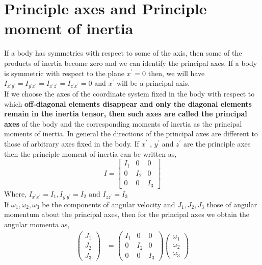 \section{Principle axes and Principle moment of inertia}
If  a body  has  symmetries  with  respect  to  some  of  the  axis,  then  some  of  the  products  of  inertia  become  zero  and  we  can  identify  the  principal  axes.   If  a  body  is  symmetric  with  respect  to  the plane $x^{\prime}=0$ then, we will have $I_{x^{\prime} y^{\prime}}=I_{y^{\prime} x^{\prime}}=I_{x^{\prime} z^{\prime}}=I_{z^{\prime} x^{\prime}}=0$ and $x^{\prime}$ will be a principal axis. 
\\If we choose the axes of the coordinate system fixed in the body with respect to which \textbf{off-diagonal elements disappear and only the diagonal elements remain in the inertia tensor, then such axes are called the principal axes} of the body and the corresponding moments of inertia as the principal moments of inertia. In general the directions of the principal axes are different to those of arbitrary axes fixed in the body. If $x^{\prime}$ , $y^{\prime}$ and $z^{\prime}$ are the principle axes then the principle moment of inertia can be written as, 
\begin{equation}
{I}=\left[ \begin{array}{ccc}
I_{1} & 0 & 0 \\
0 & I_{2} & 0 \\
0 & 0 & I_{3}
\end{array}\right]
\end{equation}
Where, $I_{x^{\prime} x^{\prime}}=I_{1}, I_{y^{\prime} y^{\prime}}=I_{2} \text { and } I_{z z^{\prime}}=I_{3}$
\\If $\omega_{1}, \omega_{2}, \omega_{3}$ be the components of angular velocity and $J_{1}, J_{2}, J_{3}$ those of angular momentum about the principal axes, then  for the principal axes  we obtain the angular momenta as,
\begin{align}
\left(\begin{array}{l}
J_{1} \\
J_{2} \\
J_{3}
\end{array}\right)&=\left(\begin{array}{lll}
I_{1} & 0 & 0 \\
0 & I_{2} & 0 \\
0 & 0 & I_{3}
\end{array}\right)\left(\begin{array}{l}
\omega_{1} \\
\omega_{2} \\
\omega_{3}
\end{array}\right)
\end{align}

